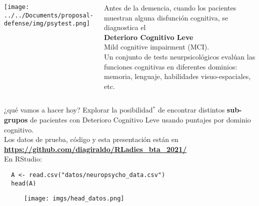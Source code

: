 \documentclass[10pt, aspectratio=169]{beamer}
\newcommand{\hltext}[2]{\colorbox{#1}{\textcolor{white}{\textbf{#2}}}}
\begin{document}
\begin{frame}[fragile]{}
\begin{overlayarea}{\textwidth}{9cm}
\vspace{0.5cm}
\begin{columns}
  \vspace{0.1cm}
  \texttt{[image: ../../Documents/proposal-defense/img/psytest.png]}
 \begin{center}
  Antes de la demencia, cuando los pacientes muestran alguna disfunción cognitiva, se diagnostica el\\ 
 \vspace{0.3cm}
 \textcolor{BlueMoon}{\textbf{\Large Deterioro Cognitivo Leve}}\\
 Mild cognitive impairment (MCI).\\
 \vspace{0.3cm}
 Un conjunto de tests neurpsicológicos evalúan las funciones cognitivas en diferentes dominios: memoria, lenguaje, habilidades visuo-espaciales, etc.
 \end{center}
\end{columns}
\end{overlayarea}
\end{frame}

{%
\begin{frame}[fragile]{¿qué vamos a hacer hoy?}
 Explorar la posibilidad$^*$ de encontrar distintos \textbf{sub-grupos} de pacientes con Deterioro Cognitivo Leve usando puntajes por dominio cognitivo.\\
 \vspace{0.2cm}
 Los datos de prueba, código y esta presentación están en\\ \hltext{PinkPeacock}{\url{https://github.com/diagiraldo/RLadies_bta_2021/}}\\
 \vspace{0.4cm}
 \pause
 En RStudio:\\
 \vspace{-0.2cm}
 \begin{verbatim}
  A <- read.csv("datos/neuropsycho_data.csv")
  head(A)
 \end{verbatim}
 \vspace{-0.6cm}
 \begin{figure}
  \texttt{[image: imgs/head\_datos.png]}
 \end{figure}
\end{frame}
}
\end{document}
